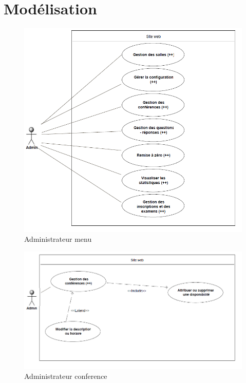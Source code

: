 \chapter{Modélisation}

    \begin{figure}[h]
        \begin{center}
            \includegraphics[scale=0.85]{images/uml/adminMenu.png} 
        \end{center}

        \caption{Administrateur menu}
        \label{a=Administrateur menu}
    \end{figure}

    \begin{figure}[h]
        \begin{center}
            \includegraphics[scale=0.75]{images/uml/adminConference.png} 
        \end{center}

        \caption{Administrateur conference}
        \label{Administrateur conference}
    \end{figure}

